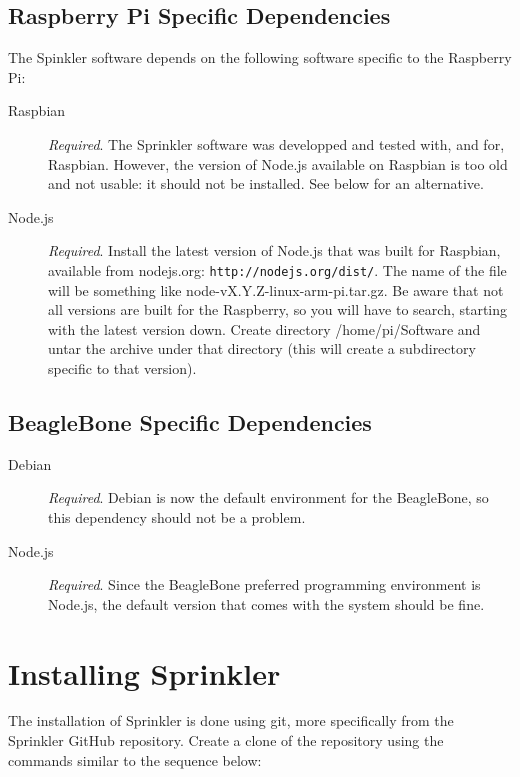 \documentclass[11pt]{book}
\begin{document}
\subsection{Raspberry Pi Specific Dependencies}
The Spinkler software depends on the following software specific to the Raspberry Pi:
\begin{description}
\item[Raspbian] \emph{Required}. The Sprinkler software was developped and tested with, and for, Raspbian. However, the version of Node.js available on Raspbian is too old and not usable: it should not be installed. See below for an alternative.
\item[Node.js] \emph{Required}. Install the latest version of Node.js that was built for Raspbian, available from nodejs.org: \texttt{http://nodejs.org/dist/}. The name of the file will be something like node-vX.Y.Z-linux-arm-pi.tar.gz. Be aware that not all versions are built for the Raspberry, so you will have to search, starting with the latest version down. Create directory /home/pi/Software and untar the archive under that directory (this will create a subdirectory specific to that version).
\end{description}
\subsection{BeagleBone Specific Dependencies}
\begin{description}
\item[Debian] \emph{Required}. Debian is now the default environment for the BeagleBone, so this dependency should not be a problem.
\item[Node.js] \emph{Required}. Since the BeagleBone preferred programming environment is Node.js, the default version that comes with the system should be fine.
\end{description}
\section{Installing Sprinkler}
The installation of Sprinkler is done using git, more specifically from the Sprinkler GitHub repository. Create a clone of the repository using the commands similar to the sequence below:
\end{document}
